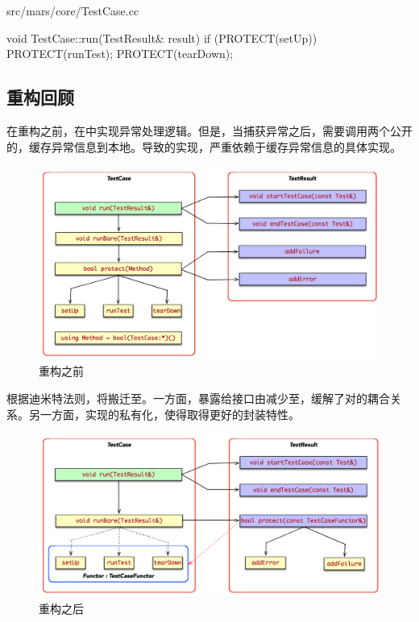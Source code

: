 \begin{content}
\begin{diff}{src/mars/core/TestCase.cc}
\begin{minicpp}
void TestCase::run(TestResult& result) {
  if (PROTECT(setUp)) {
    PROTECT(runTest);
  }
  PROTECT(tearDown);
}
 \end{minicpp}
\end{diff}

\subsection{重构回顾}

在重构之前，在中实现异常处理逻辑。但是，当捕获异常之后，需要调用两个公开的，缓存异常信息到本地。导致的实现，严重依赖于缓存异常信息的具体实现。

\begin{figure}[H]
\centering
\includegraphics[width=1.0\textwidth]{figures/xunit/coupling-1.png}
\caption{重构之前}
 \label{fig:coupling-1}
\end{figure}

根据迪米特法则，将搬迁至。一方面，暴露给接口由减少至，缓解了对的耦合关系。另一方面，实现的私有化，使得取得更好的封装特性。

\begin{figure}[H]
\centering
\includegraphics[width=1.0\textwidth]{figures/xunit/decoupling-1-1.png}
\caption{重构之后}
 \label{fig:decoupling-1-1}
\end{figure}


\end{content}
